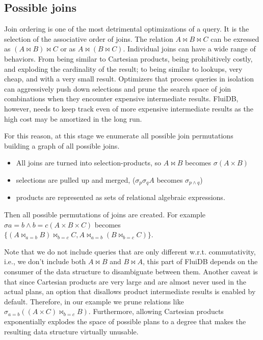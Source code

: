 \subsection{Possible joins}
\label{sec:possible_joins}

Join ordering is one of the most detrimental optimizations of a query.
It is the selection of the associative order of joins. 
The relation \(A \Join B \Join C\) can be exressed as \((A \Join B) \Join C\)
or as \(A \Join (B \Join C)\).
Individual joins can have a wide range of behaviors. From being
similar to Cartesian products, being prohibitively costly, and exploding the cardinality of the result;
to being similar to lookups, very cheap, and with a very small result.
Optimizers that process queries in isolation can aggressively push down selections
and prune the search space of join combinations when they encounter expensive intermediate results.
FluiDB, however, needs to keep track even of more expensive intermediate results as the
high cost may be amortized in the long run.

For this reason, at this stage we enumerate all possible join permutations building a graph of all possible joins.

\begin{itemize}
\item All joins are turned into selection-products, so \(A \Join B\) becomes
\(\sigma(A \times B)\)
\item selections are pulled up and merged,
(\(\sigma_p \sigma_q A\) becomes \(\sigma_{p \land q}\)) 
\item products are represented as sets of relational algebraic expressions.
\end{itemize}

Then all possible permutations of joins are created. For example
\(\sigma{a=b \land b=c}(A \times B \times C)\) becomes
\(\{(A \Join_{a=b} B) \Join_{b=c} C, A \Join_{a=b} (B \Join_{b=c}
C)\}\). 

Note that we do not include queries that are only different
w.r.t. commutativity, i.e., we don't include both \(A \Join B\) and
\(B \Join A\), this part of FluiDB depends on the consumer of the data
structure to disambiguate between them. Another caveat is that since Cartesian
products are very large and are almost never used in the actual plans, an
option that disallows product intermediate results is enabled by
default. Therefore, in our example we prune relations like
\(\sigma_{a=b}((A \times C) \Join_{b=c}B)\). Furthermore, allowing
Cartesian products exponentially explodes the space of possible plans
to a degree that makes the resulting data structure virtually unusable.


